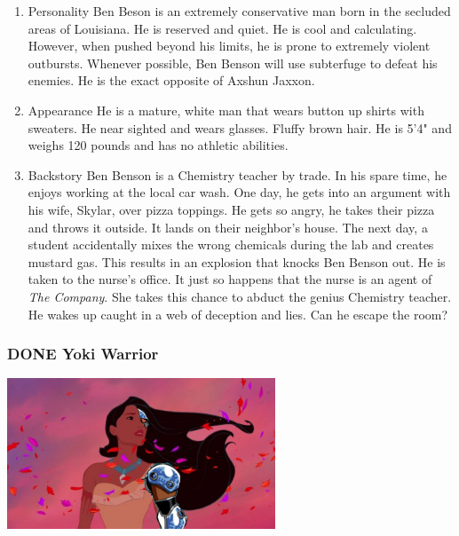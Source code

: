 \documentclass[11pt]{article}
\begin{document}
\begin{enumerate}
\item Personality
\label{sec:orgd2c92ef}
Ben Beson is an extremely conservative man born in the secluded areas of Louisiana. He is reserved and quiet. He is cool and calculating. However, when pushed beyond his limits, he is prone to extremely violent outbursts. Whenever possible, Ben Benson will use subterfuge to defeat his enemies. He is the exact opposite of Axshun Jaxxon.

\item Appearance
\label{sec:org9b63536}
He is a mature, white man that wears button up shirts with sweaters. He near sighted and wears glasses. Fluffy brown hair. He is 5'4" and weighs 120 pounds and has no athletic abilities.

\item Backstory
\label{sec:orge2b7448}
Ben Benson is a Chemistry teacher by trade. In his spare time, he enjoys working at the local car wash. One day, he gets into an argument with his wife, Skylar, over pizza toppings. He gets so angry, he takes their pizza and throws it outside. It lands on their neighbor's house. The next day, a student accidentally mixes the wrong chemicals during the lab and creates mustard gas. This results in an explosion that knocks Ben Benson out. He is taken to the nurse's office. It just so happens that the nurse is an agent of \emph{The Company}. She takes this chance to abduct the genius Chemistry teacher. He wakes up caught in a web of deception and lies. Can he escape the room?
\end{enumerate}

\subsubsection{{\bfseries\sffamily DONE} Yoki Warrior}
\label{sec:org21e6b0a}
\begin{center}
\includegraphics[width=8cm]{./img/yoki-warrior.png}
\end{center}
\end{document}
